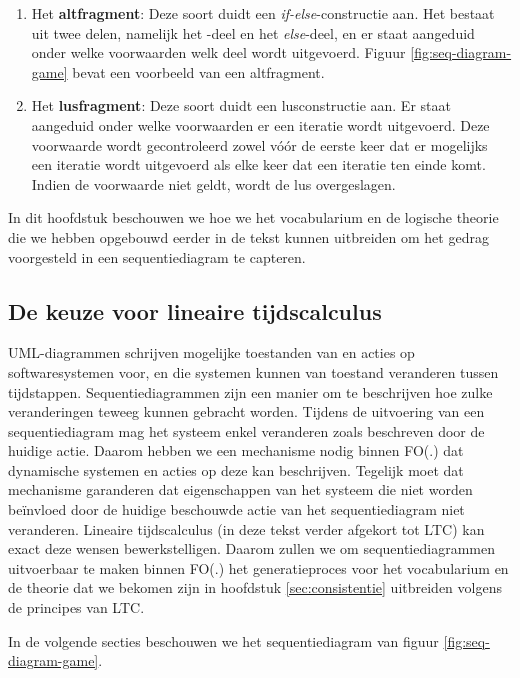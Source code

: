\begin{enumerate}
	\item Het \textbf{altfragment}: Deze soort duidt een \textit{if-else}-constructie aan. Het bestaat uit twee delen, namelijk het -deel en het \textit{else}-deel, en er staat aangeduid onder welke voorwaarden welk deel wordt uitgevoerd. Figuur \ref{fig:seq-diagram-game} bevat een voorbeeld van een altfragment.
	\item Het \textbf{lusfragment}: Deze soort duidt een lusconstructie aan. Er staat aangeduid onder welke voorwaarden er een iteratie wordt uitgevoerd. Deze voorwaarde wordt gecontroleerd zowel v\'o\'or de eerste keer dat er mogelijks een iteratie wordt uitgevoerd als elke keer dat een iteratie ten einde komt. Indien de voorwaarde niet geldt, wordt de lus overgeslagen. 
\end{enumerate}

In dit hoofdstuk beschouwen we hoe we het vocabularium en de logische theorie die we hebben opgebouwd eerder in de tekst kunnen uitbreiden om het gedrag voorgesteld in een sequentiediagram te capteren.

\subsection{De keuze voor lineaire tijdscalculus}
UML-diagrammen schrijven mogelijke toestanden van en acties op softwaresystemen voor, en die systemen kunnen van toestand veranderen tussen tijdstappen. Sequentiediagrammen zijn een manier om te beschrijven hoe zulke veranderingen teweeg kunnen gebracht worden. Tijdens de uitvoering van een sequentiediagram mag het systeem enkel veranderen zoals beschreven door de huidige actie. Daarom hebben we een mechanisme nodig binnen FO(.) dat dynamische systemen en acties op deze kan beschrijven. Tegelijk moet dat mechanisme garanderen dat eigenschappen van het systeem die niet worden be\"invloed door de huidige beschouwde actie van het sequentiediagram niet veranderen. Lineaire tijdscalculus  (in deze tekst verder afgekort tot LTC) kan exact deze wensen bewerkstelligen. Daarom zullen we om sequentiediagrammen uitvoerbaar te maken binnen FO(.) het generatieproces voor het vocabularium en de theorie dat we bekomen zijn in hoofdstuk \ref{sec:consistentie} uitbreiden volgens de principes van LTC.

In de volgende secties beschouwen we het sequentiediagram van figuur \ref{fig:seq-diagram-game}.

